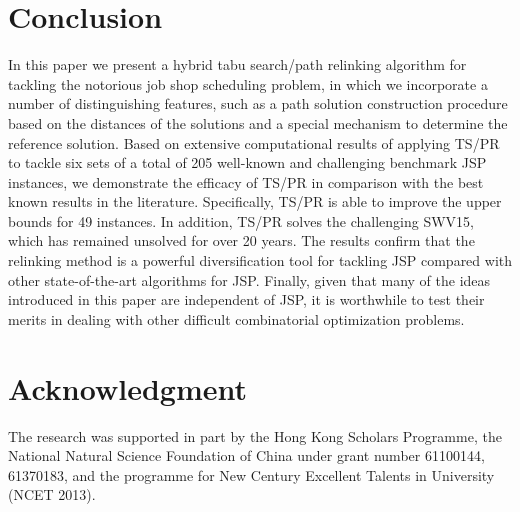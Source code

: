 \documentclass[authoryear,12pt]{elsarticle}
\begin{document}
\section{Conclusion}
\label{sec conclusions}
In this paper we present a hybrid tabu search/path relinking algorithm for tackling the notorious job shop scheduling problem, in which we incorporate a number of distinguishing features, such as a path solution construction procedure based on the distances of the solutions and a special mechanism to determine the reference solution. Based on extensive computational results of applying TS/PR to tackle six sets of a total of 205 well-known and challenging benchmark JSP instances, we demonstrate the efficacy of TS/PR in comparison with the best known results in the literature. Specifically, TS/PR is able to improve the upper bounds for 49 instances. In addition, TS/PR solves the challenging SWV15, which has remained unsolved for over 20 years.
The results confirm that the relinking method is a powerful diversification tool for tackling JSP compared with other state-of-the-art algorithms for JSP. Finally, given that many of the ideas introduced in this paper are independent of JSP, it is worthwhile to test their merits in dealing with other difficult combinatorial optimization problems.

\section*{Acknowledgment}
The research was supported in part by the Hong Kong Scholars Programme, the National Natural Science Foundation of China under grant number 61100144, 61370183, and the programme for New Century Excellent Talents in University (NCET 2013).



\end{document}
